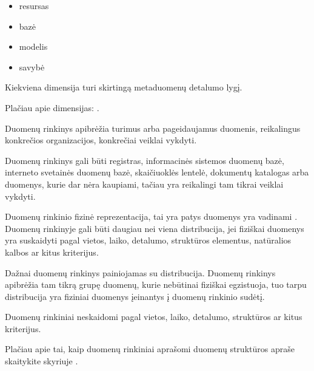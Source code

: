 \documentclass[letterpaper,10pt,lithuanian]{sphinxmanual}
\begin{document}
\begin{description}
\begin{itemize}
\item {} 
\sphinxAtStartPar
resursas

\item {} 
\sphinxAtStartPar
bazė

\item {} 
\sphinxAtStartPar
modelis

\item {} 
\sphinxAtStartPar
savybė

\end{itemize}

\sphinxAtStartPar
Kiekviena dimensija turi skirtingą metaduomenų detalumo lygį.

\sphinxAtStartPar
Plačiau apie dimensijas: {\hyperref[\detokenize{dimensijos:dimensijos}]{}}.

\sphinxAtStartPar
Duomenų rinkinys apibrėžia turimus arba pageidaujamus duomenis,
reikalingus konkrečios organizacijos, konkrečiai veiklai vykdyti.

\sphinxAtStartPar
Duomenų rinkinys gali būti registras, informacinės sistemos duomenų
bazė, interneto svetainės duomenų bazė, skaičiuoklės lentelė, dokumentų
katalogas arba duomenys, kurie dar nėra kaupiami, tačiau yra reikalingi
tam tikrai veiklai vykdyti.

\sphinxAtStartPar
Duomenų rinkinio fizinė reprezentacija, tai yra patys duomenys yra
vadinami {\hyperref[\detokenize{savokos:term-distribucija}]{}}. Duomenų rinkinyje gali būti daugiau
nei viena distribucija, jei fiziškai duomenys yra suskaidyti
pagal vietos, laiko, detalumo, struktūros elementus, natūralios kalbos
ar kitus kriterijus.

\sphinxAtStartPar
Dažnai duomenų rinkinys painiojamas su distribucija. Duomenų rinkinys
apibrėžia tam tikrą grupę duomenų, kurie nebūtinai fiziškai egzistuoja,
tuo tarpu distribucija yra fiziniai duomenys įeinantys į duomenų
rinkinio sudėtį.

\sphinxAtStartPar
Duomenų rinkiniai neskaidomi pagal vietos, laiko, detalumo, struktūros
ar kitus kriterijus.

\sphinxAtStartPar
Plačiau apie tai, kaip duomenų rinkiniai aprašomi duomenų struktūros
apraše skaitykite skyriuje {\hyperref[\detokenize{dimensijos:dataset}]{}}.


\end{description}
\end{document}
